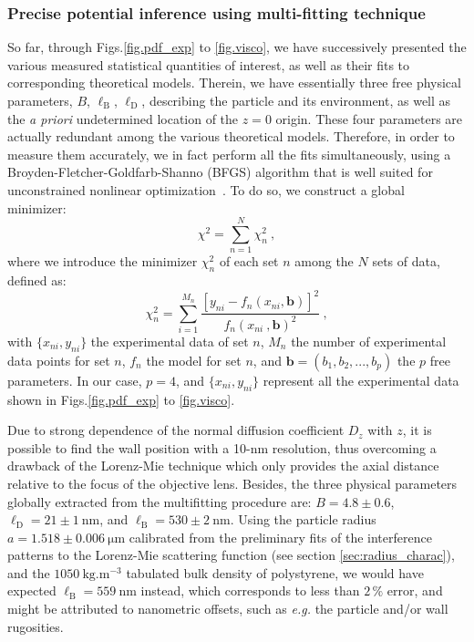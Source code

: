 \subsubsection{Precise potential inference using multi-fitting technique}
So far, through Figs.\ref{fig.pdf_exp} to \ref{fig.visco}, we have successively presented the various measured statistical quantities of interest, as well as their fits to corresponding theoretical models. Therein, we have essentially three free physical parameters, $B$, $\ell_\mathrm{B}$, $\ell_\mathrm{D}$, describing the particle and its environment, as well as the \textit{a priori} undetermined location of the $z=0$ origin. These four parameters are actually redundant among the various theoretical models. Therefore, in order to measure them accurately, we in fact perform all the fits simultaneously,
using a Broyden-Fletcher-Goldfarb-Shanno (BFGS) algorithm that is well suited for unconstrained
nonlinear optimization~\cite{dai_convergence_2002}. To do so, we construct a global minimizer:
\begin{equation}
	\chi ^ 2 = \sum _{n=1} ^{N} \chi_n ^ 2\ ,
\end{equation}
where we introduce the minimizer $\chi _n ^2$ of each set $n$ among the $N$ sets of data, defined as:
\begin{equation}
	\chi _n ^2 = \sum _{i=1} ^{M_n} \frac{[y_{ni} - f_n(x_{ni}, \mathbf{b})]^2 }{f_n(x_{ni}\ , \mathbf{b})^2}\ ,
\end{equation}
with $\{x_{ni},y_{ni}\}$ the experimental data of set $n$, $M_n$ the number of experimental data points for set $n$, $f_n$ the model for set $n$, and $\mathbf{b}=(b_1,b_2,...,b_p)$ the $p$ free parameters. In our case, $p=4$, and $\{x_{ni},y_{ni}\}$ represent all the experimental data shown in Figs.\ref{fig.pdf_exp} to \ref{fig.visco}. 

Due to strong dependence of the normal diffusion coefficient $D_z$ with $z$, it is possible to find the wall position with a 10-nm resolution, thus overcoming a drawback of the Lorenz-Mie technique which only provides the axial distance relative to the focus of the objective lens. Besides, the three physical parameters globally extracted from the multifitting procedure are: $B = 4.8 \pm 0.6$, $\ell_\mathrm{D} = 21 \pm 1~ \mathrm{nm} $, and $\ell_\mathrm{B} = 530 \pm 2~ \mathrm{nm}$. Using the particle radius $a = 1.518 \pm 0.006 ~ \mathrm{\mu m}$ calibrated from the preliminary fits of the interference patterns to the Lorenz-Mie scattering function (see section \ref{sec:radius_charac}), and the $1050 ~ \mathrm{kg.m^{-3}}$ tabulated bulk density of polystyrene, we would have expected $\ell_\mathrm{B}=559 ~ \mathrm{nm}$ instead, which corresponds to less than $2\,\%$ error, and might be attributed to nanometric offsets, such as \textit{e.g.} the particle and/or wall rugosities. 

